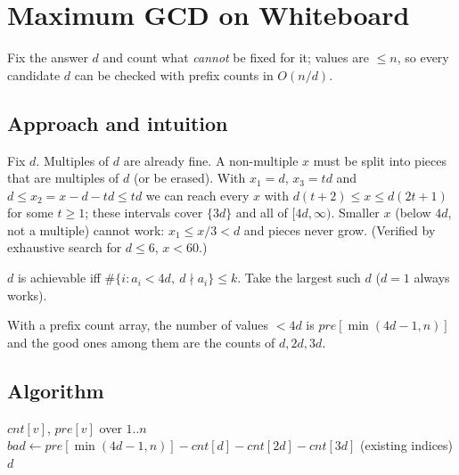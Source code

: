 \section{Maximum GCD on Whiteboard}
\label{sec:n-whiteboard}


\begin{patternbox}
Fix the answer $d$ and count what \emph{cannot} be fixed for it; values are
$\le n$, so every candidate $d$ can be checked with prefix counts in
$O(n/d)$.
\end{patternbox}

\subsection*{Approach and intuition}

Fix $d$. Multiples of $d$ are already fine. A non-multiple $x$ must be split
into pieces that are multiples of $d$ (or be erased). With $x_1=d$,
$x_3=td$ and $d\le x_2=x-d-td\le td$ we can reach every $x$ with
$d(t+2)\le x\le d(2t+1)$ for some $t\ge1$; these intervals cover $\{3d\}$ and
all of $[4d,\infty)$. Smaller $x$ (below $4d$, not a multiple) cannot work:
$x_1\le x/3<d$ and pieces never grow. (Verified by exhaustive search for
$d\le6$, $x<60$.)

\begin{ideabox}[Criterion]
$d$ is achievable iff $\#\{i : a_i<4d,\ d\nmid a_i\}\le k$. Take the largest
such $d$ ($d=1$ always works).
\end{ideabox}

With a prefix count array, the number of values $<4d$ is $pre[\min(4d-1,n)]$
and the good ones among them are the counts of $d,2d,3d$.

\subsection*{Algorithm}
\begin{algorithmic}[1]
\State $cnt[v]$, $pre[v]$ over $1..n$
  \State $bad\gets pre[\min(4d-1,n)]-cnt[d]-cnt[2d]-cnt[3d]$ (existing indices)
   \Return $d$ \EndIf
\EndFor
\end{algorithmic}

